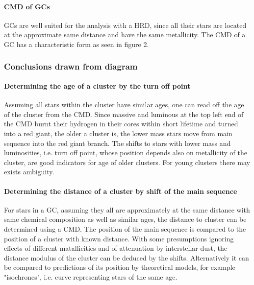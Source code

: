 \paragraph{CMD of GCs}
GCs are well suited for the analysis with a HRD, since all their stars are located at the approximate same distance and have the same metallicity. The CMD of a GC has a characteristic form as seen in figure 2.

\subsubsection{Conclusions drawn from diagram}
\paragraph{Determining the age of a cluster by the turn off point}
Assuming all stars within the cluster have similar ages, one can read off the age of the cluster from the CMD. Since massive and luminous at the top left end of the CMD burnt their hydrogen in their cores within short lifetime and turned into a red giant, the older a cluster is, the lower mass stars move from main sequence into the red giant branch. The shifts to stars with lower mass and luminosities, i.e. turn off point, whose position depends also on metallicity of the cluster, are good indicators for age of older clusters. For young clusters there may exists ambiguity. 

\paragraph{Determining the distance of a cluster by shift of the main sequence}
For stars in a GC, assuming they all are approximately at the same distance with same chemical composition as well as similar ages, the distance to cluster can be determined using a CMD. The position of the main sequence is compared to the position of a cluster with known distance. With some presumptions ignoring effects of different matallicities and of attenuation by interstellar dust, the distance modulus of the cluster can be deduced by the shifts. Alternatively it can be compared to predictions of its position by theoretical models, for example "isochrones", i.e. curve representing stars of the same age.
